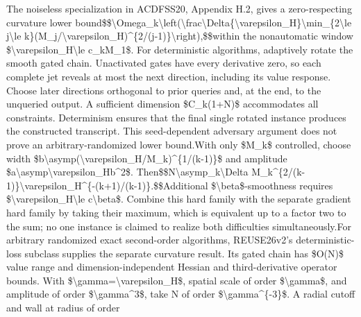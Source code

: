 \documentclass[10pt,a4paper]{article}
\begin{document}
\begingroup\raggedright\sloppy The noiseless specialization in ACDFSS20,\allowbreak{} Appendix H.2,\allowbreak{} gives a zero-respecting curvature lower bound\newline{}\$\$\textbackslash{}Omega\_\allowbreak{}k\textbackslash{}left(\textbackslash{}frac\textbackslash{}Delta\{\textbackslash{}varepsilon\_\allowbreak{}H\}\textbackslash{}min\_\allowbreak{}\{2\textbackslash{}le j\textbackslash{}le k\}(M\_\allowbreak{}j/\allowbreak{}\textbackslash{}varepsilon\_\allowbreak{}H)\textasciicircum{}\{2/\allowbreak{}(j-1)\}\textbackslash{}right),\allowbreak{}\$\$\newline{}within the nonautomatic window \$\textbackslash{}varepsilon\_\allowbreak{}H\textbackslash{}le c\_\allowbreak{}kM\_\allowbreak{}1\$. For deterministic algorithms,\allowbreak{} adaptively rotate the smooth gated chain. Unactivated gates have every derivative zero,\allowbreak{} so each complete jet reveals at most the next direction,\allowbreak{} including its value response. Choose later directions orthogonal to prior queries and,\allowbreak{} at the end,\allowbreak{} to the unqueried output. A sufficient dimension \$C\_\allowbreak{}k(1+N)\$ accommodates all constraints. Determinism ensures that the final single rotated instance produces the constructed transcript. This seed-dependent adversary argument does not prove an arbitrary-randomized lower bound.\newline{}\newline{}With only \$M\_\allowbreak{}k\$ controlled,\allowbreak{} choose width \$b\textbackslash{}asymp(\textbackslash{}varepsilon\_\allowbreak{}H/\allowbreak{}M\_\allowbreak{}k)\textasciicircum{}\{1/\allowbreak{}(k-1)\}\$ and amplitude \$a\textbackslash{}asymp\textbackslash{}varepsilon\_\allowbreak{}Hb\textasciicircum{}2\$. Then\newline{}\$\$N\textbackslash{}asymp\_\allowbreak{}k\textbackslash{}Delta M\_\allowbreak{}k\textasciicircum{}\{2/\allowbreak{}(k-1)\}\textbackslash{}varepsilon\_\allowbreak{}H\textasciicircum{}\{-(k+1)/\allowbreak{}(k-1)\}.\$\$\newline{}Additional \$\textbackslash{}beta\$-smoothness requires \$\textbackslash{}varepsilon\_\allowbreak{}H\textbackslash{}le c\textbackslash{}beta\$. Combine this hard family with the separate gradient hard family by taking their maximum,\allowbreak{} which is equivalent up to a factor two to the sum;\allowbreak{} no one instance is claimed to realize both difficulties simultaneously.\newline{}\newline{}For arbitrary randomized exact second-order algorithms,\allowbreak{} REUSE26v2's deterministic-loss subclass supplies the separate curvature result. Its gated chain has \$O(N)\$ value range and dimension-independent Hessian and third-derivative operator bounds. With \$\textbackslash{}gamma=\allowbreak{}\textbackslash{}varepsilon\_\allowbreak{}H\$,\allowbreak{} spatial scale of order \$\textbackslash{}gamma\$,\allowbreak{} and amplitude of order \$\textbackslash{}gamma\textasciicircum{}3\$,\allowbreak{} take N of order \$\textbackslash{}gamma\textasciicircum{}\{-3\}\$. A radial cutoff and wall at radius of order 
\end{document}
